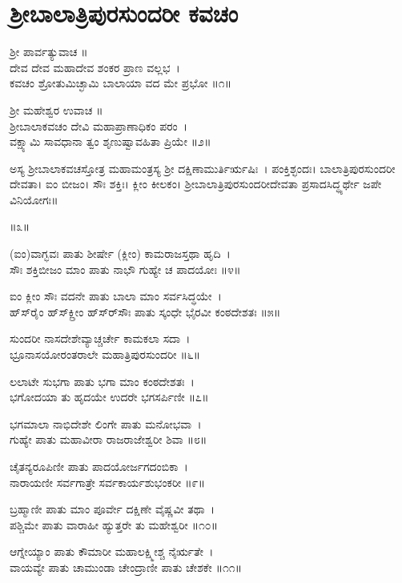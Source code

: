 \section{ಶ್ರೀಬಾಲಾತ್ರಿಪುರಸುಂದರೀ ಕವಚಂ}
ಶ್ರೀ ಪಾರ್ವತ್ಯುವಾಚ ॥\\
ದೇವ ದೇವ ಮಹಾದೇವ ಶಂಕರ ಪ್ರಾಣ ವಲ್ಲಭ~।\\
ಕವಚಂ ಶ್ರೋತುಮಿಚ್ಛಾಮಿ ಬಾಲಾಯಾ ವದ ಮೇ ಪ್ರಭೋ ॥೧॥

ಶ್ರೀ ಮಹೇಶ್ವರ ಉವಾಚ ॥\\
ಶ್ರೀಬಾಲಾಕವಚಂ ದೇವಿ ಮಹಾಪ್ರಾಣಾಧಿಕಂ ಪರಂ~।\\
ವಕ್ಷ್ಯಾಮಿ ಸಾವಧಾನಾ ತ್ವಂ ಶೃಣುಷ್ವಾವಹಿತಾ ಪ್ರಿಯೇ ॥೨॥

ಅಸ್ಯ ಶ್ರೀಬಾಲಾಕವಚಸ್ತೋತ್ರ ಮಹಾಮಂತ್ರಸ್ಯ ಶ್ರೀ ದಕ್ಷಿಣಾಮುರ್ತಿರ್ಋಷಿಃ~। ಪಂಕ್ತಿಶ್ಛಂದಃ। ಬಾಲಾತ್ರಿಪುರಸುಂದರೀ ದೇವತಾ। ಐಂ ಬೀಜಂ। ಸೌಃ ಶಕ್ತಿಃ। ಕ್ಲೀಂ ಕೀಲಕಂ। ಶ್ರೀಬಾಲಾತ್ರಿಪುರಸುಂದರೀದೇವತಾ ಪ್ರಸಾದಸಿದ್ಧ್ಯರ್ಥೇ ಜಪೇ ವಿನಿಯೋಗಃ॥

॥೩॥

(ಐಂ)ವಾಗ್ಭವಃ ಪಾತು ಶೀರ್ಷೇ (ಕ್ಲೀಂ) ಕಾಮರಾಜಸ್ತಥಾ ಹೃದಿ~।\\
ಸೌಃ ಶಕ್ತಿಬೀಜಂ ಮಾಂ ಪಾತು ನಾಭೌ ಗುಹ್ಯೇ ಚ ಪಾದಯೋಃ ॥೪॥

ಐಂ ಕ್ಲೀಂ ಸೌಃ ವದನೇ ಪಾತು ಬಾಲಾ ಮಾಂ ಸರ್ವಸಿದ್ಧಯೇ~।\\
ಹ್‌ಸ್‌ರೈಂ ಹ್‌ಸ್‌ಕ್ಲ್ರೀಂ ಹ್‌ಸ್‌ರ್‌ಸೌಃ ಪಾತು ಸ್ಕಂಧೇ ಭೈರವೀ ಕಂಠದೇಶತಃ ॥೫॥

ಸುಂದರೀ ನಾಸದೇಶೇವ್ಯಾಚ್ಚರ್ಚೇ ಕಾಮಕಲಾ ಸದಾ~।\\
ಭ್ರೂನಾಸಯೋರಂತರಾಲೇ ಮಹಾತ್ರಿಪುರಸುಂದರೀ ॥೬॥

ಲಲಾಟೇ ಸುಭಗಾ ಪಾತು ಭಗಾ ಮಾಂ ಕಂಠದೇಶತಃ~।\\
ಭಗೋದಯಾ ತು ಹೃದಯೇ ಉದರೇ ಭಗಸರ್ಪಿಣೀ ॥೭॥

ಭಗಮಾಲಾ ನಾಭಿದೇಶೇ ಲಿಂಗೇ ಪಾತು ಮನೋಭವಾ~।\\
ಗುಹ್ಯೇ ಪಾತು ಮಹಾವೀರಾ ರಾಜರಾಜೇಶ್ವರೀ ಶಿವಾ ॥೮॥

ಚೈತನ್ಯರೂಪಿಣೀ ಪಾತು ಪಾದಯೋರ್ಜಗದಂಬಿಕಾ~।\\
ನಾರಾಯಣೀ ಸರ್ವಗಾತ್ರೇ ಸರ್ವಕಾರ್ಯಶುಭಂಕರೀ ॥೯॥

ಬ್ರಹ್ಮಾಣೀ ಪಾತು ಮಾಂ ಪೂರ್ವೇ ದಕ್ಷಿಣೇ ವೈಷ್ಣವೀ ತಥಾ~।\\
ಪಶ್ಚಿಮೇ ಪಾತು ವಾರಾಹೀ ಹ್ಯುತ್ತರೇ ತು ಮಹೇಶ್ವರೀ ॥೧೦॥

ಆಗ್ನೇಯ್ಯಾಂ ಪಾತು ಕೌಮಾರೀ ಮಹಾಲಕ್ಷ್ಮೀಶ್ಚ ನೈರ್ಋತೇ~।\\
ವಾಯವ್ಯೇ ಪಾತು ಚಾಮುಂಡಾ ಚೇಂದ್ರಾಣೀ ಪಾತು ಚೇಶಕೇ ॥೧೧॥

